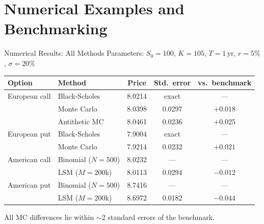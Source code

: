 \documentclass[aspectratio=169,10pt]{beamer}
\begin{document}
\section{Numerical Examples and Benchmarking}

\begin{frame}{Numerical Results: All Methods}
  Parameters: $S_0=100$, $K=105$, $T=1$\,yr, $r=5\%$, $\sigma=20\%$

  \bigskip
  \begin{tabular}{llccc}
    \toprule
    Option & Method & Price & Std.\ error & vs.\ benchmark \\
    \midrule
    European call & Black-Scholes   & 8.0214 & exact    & --- \\
                  & Monte Carlo     & 8.0398 & 0.0297   & $+0.018$ \\
                  & Antithetic MC   & 8.0461 & 0.0236   & $+0.025$ \\
    \midrule
    European put  & Black-Scholes   & 7.9004 & exact    & --- \\
                  & Monte Carlo     & 7.9214 & 0.0232   & $+0.021$ \\
    \midrule
    American call & Binomial ($N=500$) & 8.0232 & ---   & --- \\
                  & LSM ($M=200$k)  & 8.0113 & 0.0294   & $-0.012$ \\
    \midrule
    American put  & Binomial ($N=500$) & 8.7416 & ---   & --- \\
                  & LSM ($M=200$k)  & 8.6972 & 0.0182   & $-0.044$ \\
    \bottomrule
  \end{tabular}

  \medskip
  \footnotesize All MC differences lie within $\sim$2 standard errors of the benchmark.
\end{frame}
\end{document}
